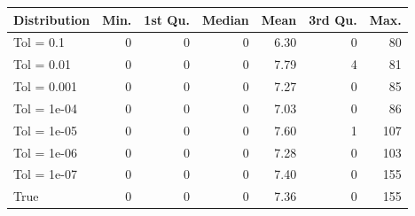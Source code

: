 \begin{figure} 
\begin{tabular}{lrrrrrr}
 Distribution & Min. & 1st Qu. & Median & Mean & 3rd Qu. & Max. \\ 
  \hline
\hline
Tol =  0.1 & 0 & 0 & 0 & 6.30 & 0 & 80 \\ 
  Tol =  0.01 & 0 & 0 & 0 & 7.79 & 4 & 81 \\ 
  Tol =  0.001 & 0 & 0 & 0 & 7.27 & 0 & 85 \\ 
  Tol =  1e-04 & 0 & 0 & 0 & 7.03 & 0 & 86 \\ 
  Tol =  1e-05 & 0 & 0 & 0 & 7.60 & 1 & 107 \\ 
  Tol =  1e-06 & 0 & 0 & 0 & 7.28 & 0 & 103 \\ 
  Tol =  1e-07 & 0 & 0 & 0 & 7.40 & 0 & 155 \\ 
  True & 0 & 0 & 0 & 7.36 & 0 & 155 \\ 
  \end{tabular}
\label{tab:SummaryTable}
\end{figure} 
